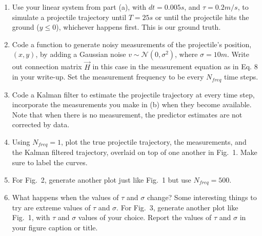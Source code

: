 \documentclass{article}
\newcommand{\vH}{\vec{H}}
\begin{document}
\begin{enumerate}
\item Use your linear system from part (a), with $dt = 0.005s$, and $\tau = 0.2 m/s$, to simulate a projectile trajectory until $T=25s$ or until the projectile hits the ground ($y\le0$), whichever happens first. This is our ground truth.
\item Code a function to generate noisy measurements of the projectile's position, $(x, y)$, by adding a Gaussian noise $v\sim \mathcal{N} (0, \sigma^2)$, where $\sigma = 10 m$. Write out connection matrix $\vH$ in this case in the measurement equation as in Eq. 8 in your write-up. Set the measurement frequency to be every $N_{freq}$ time steps. 
\item Code a Kalman filter to estimate the projectile trajectory at every time step, incorporate the measurements you make in (b) when they become available. Note that when there is no measurement, the predictor estimates are not corrected by data.
\item Using $N_{freq} = 1$, plot the true projectile trajectory, the measurements, and the Kalman filtered trajectory, overlaid on top of one another in Fig.~1. Make sure to label the curves.
\item For Fig.~2, generate another plot just like Fig.~1 but use $N_{freq}=500$. 
\item What happens when the values of $\tau$ and $\sigma$ change? Some interesting things to try are extreme values of $\tau$ and $\sigma$. For Fig.~3, generate another plot like Fig.~1, with $\tau$ and $\sigma$ values of your choice. Report the values of $\tau$ and $\sigma$ in your figure caption or title.
\end{enumerate}
\end{document}
